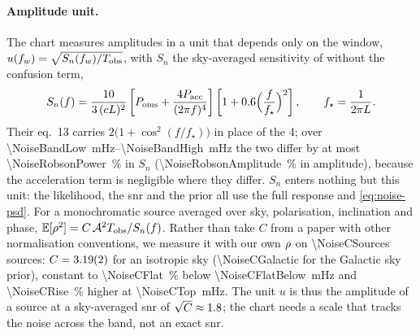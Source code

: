 \paragraph{Amplitude unit.}
\label{app:chart-unit}
The chart measures amplitudes in a unit that depends only on the window,
$u(\fw) = \sqrt{S_n(\fw)/\Tobs}$, with $S_n$ the sky-averaged sensitivity of
\citet[eq.~1]{robson2019construction} without the confusion term,
\begin{equation}
  S_n(f) = \frac{10}{3\,(cL)^2}\left[P_{\rm oms} + \frac{4P_{\rm acc}}{(2\pi f)^4}\right]
  \left[1+0.6\Bigl(\frac{f}{f_\star}\Bigr)^2\right],\qquad f_\star = \frac{1}{2\pi L}.
  \label{eq:noise-sky}
\end{equation}
Their eq.~13 carries $2\bigl(1+\cos^2(f/f_\star)\bigr)$ in place of the 4; over
\qtyrange{\NoiseBandLow}{\NoiseBandHigh}{\milli\hertz} the two differ by at most
\qty{\NoiseRobsonPower}{\percent} in $S_n$ (\qty{\NoiseRobsonAmplitude}{\percent} in amplitude),
because the acceleration term is negligible where they differ. $S_n$ enters nothing but this
unit: the likelihood, the \ac{snr} and the prior all use the full response and
\cref{eq:noise-psd}. For a monochromatic source averaged over sky, polarisation, inclination and
phase, $\E[\snr^2] = C\,\Amp^2\Tobs/S_n(f)$. Rather than take $C$ from a paper with other
normalisation conventions, we measure it with our own $\snr$ on \num{\NoiseCSources} sources:
$C = \num{\NoiseC \pm \NoiseCError}$ for an isotropic sky
(\num{\NoiseCGalactic} for the Galactic sky prior), constant to \qty{\NoiseCFlat}{\percent} below
\qty{\NoiseCFlatBelow}{\milli\hertz} and \qty{\NoiseCRise}{\percent} higher at
\qty{\NoiseCTop}{\milli\hertz}. The unit $u$ is thus the amplitude of a source at a sky-averaged
\ac{snr} of $\sqrt C\approx\NoiseSqrtC{}$; the chart needs a scale that tracks the noise across
the band, not an exact \acs{snr}.

